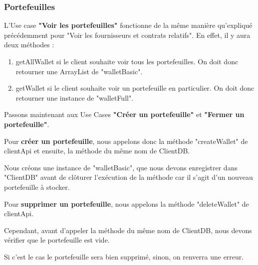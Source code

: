 \newpage

\subsubsection{Portefeuilles}
\begin{flushleft}
L'Use case \textbf{"Voir les portefeuilles"} fonctionne de la même manière qu'expliqué précédemment pour "Voir les fournisseurs et contrats relatifs".
En effet, il y aura deux méthodes : 
\end{flushleft}
\begin{enumerate}
\item getAllWallet si le client souhaite voir tous les portefeuilles. On doit donc retourner une ArrayList de "walletBasic".
\item getWallet si le client souhaite voir un portefeuille en particulier. On doit donc retourner une instance de "walletFull".
\end{enumerate}

\begin{flushleft}
Passons maintenant aux Use Cases \textbf{"Créer un portefeuille"} et \textbf{"Fermer un portefeuille"}.
\end{flushleft}

\begin{flushleft}
Pour \textbf{créer un portefeuille}, nous appelons donc la méthode "createWallet" de clientApi et ensuite, la méthode du même nom de ClientDB.
\end{flushleft}

\begin{flushleft}
Nous créons une instance de "walletBasic", que nous devons enregistrer dans "ClientDB" avant de clôturer l'exécution de la méthode car il s'agit d'un nouveau portefeuille à stocker.
\end{flushleft}

\begin{flushleft}
Pour \textbf{supprimer un portefeuille}, nous appelons la méthode "deleteWallet" de clientApi.
\end{flushleft}
\begin{flushleft}
Cependant, avant d'appeler la méthode du même nom de ClientDB, nous devons vérifier que le portefeuille est vide.
\end{flushleft}
\begin{flushleft}
Si c'est le cas le portefeuille sera bien supprimé, sinon, on renverra une erreur.
\end{flushleft}

